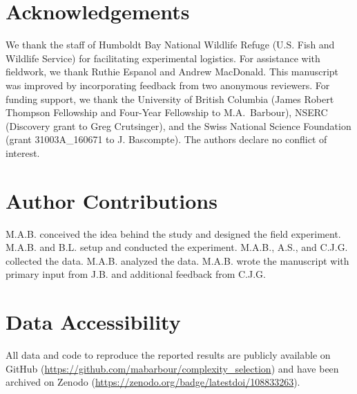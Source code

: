 \documentclass[11pt,]{article}
\begin{document}
\section{Acknowledgements}\label{acknowledgements}

We thank the staff of Humboldt Bay National Wildlife Refuge (U.S. Fish
and Wildlife Service) for facilitating experimental logistics. For
assistance with fieldwork, we thank Ruthie Espanol and Andrew MacDonald.
This manuscript was improved by incorporating feedback from two
anonymous reviewers. For funding support, we thank the University of
British Columbia (James Robert Thompson Fellowship and Four-Year
Fellowship to M.A.~Barbour), NSERC (Discovery grant to Greg Crutsinger),
and the Swiss National Science Foundation (grant 31003A\_160671 to J.
Bascompte). The authors declare no conflict of interest.

\section{Author Contributions}\label{author-contributions}

M.A.B. conceived the idea behind the study and designed the field
experiment. M.A.B. and B.L. setup and conducted the experiment. M.A.B.,
A.S., and C.J.G. collected the data. M.A.B. analyzed the data. M.A.B.
wrote the manuscript with primary input from J.B. and additional
feedback from C.J.G.

\section{Data Accessibility}\label{data-accessibility}

All data and code to reproduce the reported results are publicly
available on GitHub
(\url{https://github.com/mabarbour/complexity_selection}) and have been
archived on Zenodo (\url{https://zenodo.org/badge/latestdoi/108833263}).


\end{document}
